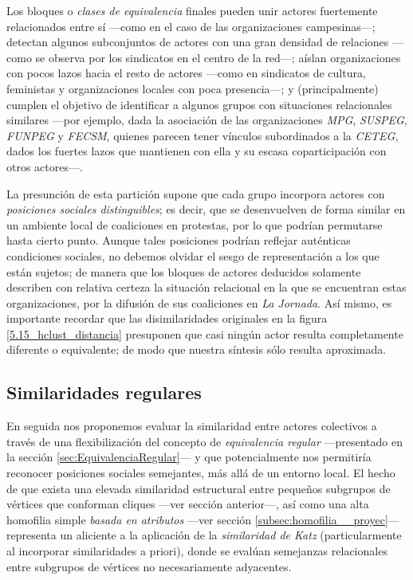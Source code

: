 \documentclass[letterpaper, 11pt]{book}
\theoremstyle{definition}
\theoremstyle{remark}
\begin{document}
Los bloques o \emph{clases de equivalencia} finales pueden unir actores fuertemente relacionados entre sí ---como en el caso de las organizaciones campesinas---; 
detectan algunos subconjuntos de actores con una gran densidad de relaciones ---como se observa por los sindicatos en el centro de la red---; 
aíslan organizaciones con pocos lazos hacia el resto de actores ---como en sindicatos de cultura, feministas y organizaciones locales con poca presencia---; 
y (principalmente) cumplen el objetivo de identificar a algunos grupos con situaciones relacionales similares ---por ejemplo, dada la asociación de las organizaciones \emph{MPG}, \emph{SUSPEG}, \emph{FUNPEG} y \emph{FECSM}, quienes parecen tener vínculos subordinados a la \emph{CETEG}, dados los fuertes lazos que mantienen con ella y su escasa coparticipación con otros actores---. 


La presunción de esta partición supone que cada grupo incorpora actores con \emph{posiciones sociales distinguibles}; es decir, que se desenvuelven de forma similar en un ambiente local de coaliciones en protestas, por lo que podrían permutarse hasta cierto punto. 
Aunque tales posiciones podrían reflejar auténticas condiciones sociales, no debemos olvidar el sesgo de representación a los que están sujetos; de manera que los bloques de actores deducidos solamente describen con relativa certeza la situación relacional en la que se encuentran estas organizaciones, por la difusión de sus coaliciones en \emph{La Jornada}. 
Así mismo, es importante recordar que las disimilaridades originales en la figura \ref{5.15_hclust_distancia} presuponen que casi ningún actor resulta completamente diferente o equivalente; de modo que nuestra síntesis sólo resulta aproximada. 





\subsection{Similaridades regulares}
\label{subsec:similaridadReg__proyec}

En seguida nos proponemos evaluar la similaridad entre actores colectivos a través de una flexibilización del concepto de \emph{equivalencia regular} ---presentado en la sección \ref{sec:EquivalenciaRegular}--- y que potencialmente nos permitiría reconocer posiciones sociales semejantes, más allá de un entorno local. 
El hecho de que exista una elevada similaridad estructural entre pequeños subgrupos de vértices que conforman cliques ---ver sección anterior---, así como una alta homofilia simple \emph{basada en atributos} ---ver sección \ref{subsec:homofilia__proyec}--- representa un aliciente a la aplicación de la \emph{similaridad de Katz} (particularmente al incorporar similaridades a priori), donde se evalúan semejanzas relacionales entre subgrupos de vértices no necesariamente adyacentes. 
\end{document}

